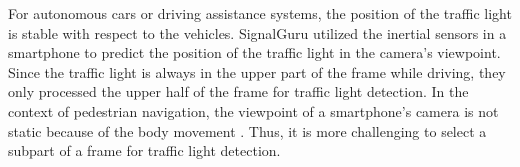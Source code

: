 For autonomous cars or driving assistance systems, the position of the traffic light is stable with respect to the vehicles.
SignalGuru \cite{signalguru} utilized the inertial sensors in a smartphone to predict the position of the traffic light in the camera's viewpoint.
Since the traffic light is always in the upper part of the frame while driving, they only processed the upper half of the frame for traffic light detection.
In the context of pedestrian navigation, the viewpoint of a smartphone's camera is not static because of the body movement \cite{sensor_pedestrian,sensor_pedestrian2}.
Thus, it is more challenging to select a subpart of a frame for traffic light detection.





